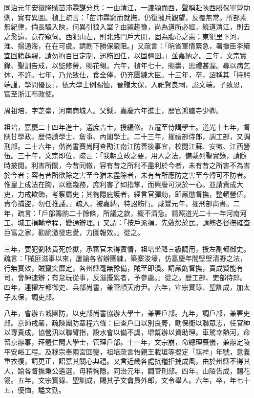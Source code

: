 \begin{pinyinscope}
同治元年安徽降賊苗沛霖謀分兵：一由清江，一渡潁而西，聲稱赴陜西勝保軍營助剿，實有異圖。楨上疏言：「苗沛霖窮而就撫，仍復擁兵觀望，反覆無常。所部素無紀律，倘長驅入陜，何異引狼入室？由潁趨豫，尚為道所必經，繞道清江，則去之愈遠，意存窺伺。西犯山左，則北路門戶大開，固為腹心之患；東犯里下河，淮、揚通海，在在可虞。請飭下勝保嚴阻。」又疏言：「皖省軍情緊急，署撫臣李續宜回籍葬親，請勿拘百日定制，迅飭回任，以固疆圉。」並嘉納之。三年，文宗實錄、聖訓告成，以監修勞，賜花翎。六年，楨年七十，賜壽，恩禮甚渥。尋以病乞休，不許。七年，乃允致仕，食全俸，仍充團練大臣。十三年，卒，詔稱其「持躬端謹，學問優長」，依大學士例賜恤，晉贈太保，入祀賢良祠，謚文端。子致恩，官至浙江布政使。

周祖培，字芝臺，河南商城人。父鉞，嘉慶六年進士，歷官鴻臚寺少卿。

祖培，嘉慶二十四年進士，選庶吉士，授編修。五遷至侍講學士。道光十七年，督陜甘學政。歷侍讀學士、詹事、內閣學士。二十三年，擢禮部侍郎，調工部，又調刑部。二十六年，偕尚書賽尚阿查勘江南江防善後事宜，校閱江蘇、安徽、江西營伍。三十年，文宗即位，疏言：「我朝立政之要，用人之法，備載列聖實錄，請隨時披閱。利害所關，今昔同轍，容有昔之所利不盡利於今者，未有昔之所害不為害於今者；容有昔所欲除之害至今猶未盡除者，未有昔所應防之害至今轉可不防者。惟皇上成法在胸，以應幾務，庶利害了如指掌，而興廢可決於一心。並請責成大吏，力戒欺飾，考察屬吏；其徇隱庇護者，經言官彈劾，即嚴懲督撫，整頓營伍，責令捕盜，勿任推諉。」疏入，被嘉納，特詔飭行。咸豐元年，擢刑部尚書。二年，疏言：「戶部籌餉二十餘條，所議之款，緩不濟急。請照道光二十一年河南河工、城工捐輸章程，變通辦理。」又謂：「按戶派捐，先斂怨於民。請飭各督撫確查巨富之家，勸諭激發忠愛，力圖報效。」從之。

三年，要犯劉秋貴死於獄，承審官未得實情，祖培坐降三級調用，授左副都御史。疏言：「賊匪滋事以來，屢諭各省辦團練，築寨浚壕，仿嘉慶年間堅壁清野之法，行無實效，賊竄突靡定，各州縣毫無豫備，賊至即潰。請嚴飭督撫，責成賢能有司，會紳速辦；有怠玩從事，反滋擾累者，予參處。」從之。歷工部、吏部侍郎。四年，連擢左都御史、兵部尚書，兼管順天府尹。六年，宣宗實錄、聖訓成，加太子太保，調吏部。

八年，會辦五城團防，以吏部尚書協辦大學士，兼署戶部。九年，調戶部，兼署吏部。京師戒嚴，疏陳團防章程六條：曰查戶口以別良莠，勸保衛以聯眾志，任官紳以專責成，協營汛以聯臂指，設水會以備不虞，增幫辦以資助理。車駕幸熱河，命留京辦事，拜體仁閣大學士，管理戶部。十一年，文宗崩，命總理喪儀，兼辦定陵平安峪工程。及穆宗奉兩宮回鑾，祖培疏言怡親王載垣等擬定「祺祥」年號，意義重衣復，請更正，詔嘉其關心典禮。又言近畿各處抗糧拒捕成風，由於州縣不得其人，諭各督撫秉公遴選，毋稍徇隱。同治元年，調管刑部。四年，山陵告成，賜花翎。五年，文宗實錄、聖訓成，賜其子文龠員外郎，文令舉人。六年，卒，年七十五，優恤，謚文勤。


\end{pinyinscope}
